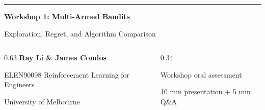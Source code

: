 \begin{frame}[plain]
  \vspace{0.62cm}
  {\color{Teal}\rule{1.10cm}{2.6pt}}\par
  \vspace{0.38cm}
  {\fontsize{25}{28}\selectfont\bfseries\color{Navy}
    Workshop 1: Multi-Armed Bandits\par}
  \vspace{0.18cm}
  {\fontsize{17}{20}\selectfont\color{Ink}
    Exploration, Regret, and Algorithm Comparison\par}

  \vfill

  \begin{columns}[T,onlytextwidth]
    \begin{column}{0.63\textwidth}
      {\fontsize{12.2}{14.5}\selectfont\bfseries Ray Li \& James Condos}\par
      \vspace{0.12cm}
      {\fontsize{10.2}{12.2}\selectfont\color{Muted}
        ELEN90098 Reinforcement Learning for Engineers\par
        University of Melbourne}
    \end{column}
    \begin{column}{0.34\textwidth}
      \raggedleft
      {\fontsize{9.6}{11.5}\selectfont\color{Muted}
        Workshop oral assessment\par
        10 min presentation + 5 min Q\&A}
    \end{column}
  \end{columns}
  \vspace{0.55cm}
\end{frame}
